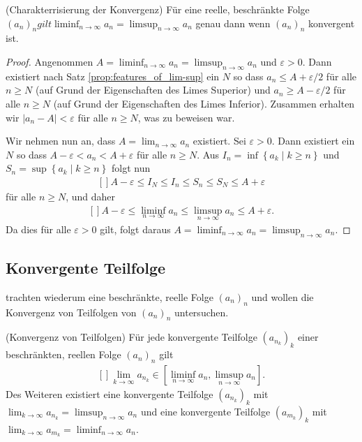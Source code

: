 \documentclass[../Analysis1_script.tex]{subfiles}
\begin{document}
\begin{corollary}{(Charakterrisierung der Konvergenz)}
	Für eine reelle, beschränkte Folge $(a_n)_n gilt \liminf _{n\to \infty }a_n=\limsup _{n\to \infty }a_n$ genau dann wenn $(a_n)_n$ konvergent ist. 
\end{corollary}

\begin{proof}
	Angenommen $A=\liminf _{n\to \infty }a_n=\limsup _{n\to \infty }a_n$ und $\varepsilon >0$. Dann existiert nach Satz \ref{prop:features_of_lim-sup} ein $N$ so dass $a_n\leq A+\varepsilon /2$ für alle $n\geq N$ (auf Grund der Eigenschaften des Limes Superior) und $a_n\geq A-\varepsilon /2$ für alle $n\geq N$ (auf Grund der Eigenschaften des Limes Inferior). Zusammen erhalten wir $|a_n-A|<\varepsilon$ für alle $n\geq N$, was zu beweisen war.
	
	Wir nehmen nun an, dass $A=\lim _{n\to \infty }a_n$ existiert. Sei $\varepsilon >0$. Dann existiert ein $N$ so dass $A-\varepsilon <a_n<A+\varepsilon$ für alle $n\geq N$. Aus $I_n=\inf \left \lbrace {a_k} \mid {k\geq n}\right \rbrace$ und $S_n=\sup \left \lbrace {a_k} \mid {k\geq n}\right \rbrace$ folgt nun
	\[\begin{aligned}[]
		A-\varepsilon \leq I_N\leq I_n\leq S_n\leq S_N\leq A+\varepsilon
	\end{aligned}\]
	für alle $n\geq N$, und daher
	\[\begin{aligned}[]
		A-\varepsilon \leq \liminf _{n\to \infty }a_n\leq \limsup _{n\to \infty }a_n \leq A+\varepsilon .
	\end{aligned}\]
	Da dies für alle $\varepsilon >0$ gilt, folgt daraus $A=\liminf _{n\to \infty }a_n=\limsup _{n\to \infty }a_n$. 
\end{proof}

\subsection{Konvergente Teilfolge}

trachten wiederum eine beschränkte, reelle Folge $(a_n)_n$ und wollen die Konvergenz von Teilfolgen von $(a_n)_n$ untersuchen.

\begin{proposition}{(Konvergenz von Teilfolgen)}
	Für jede konvergente Teilfolge $(a_{n_k})_k$ einer beschränkten, reellen Folge $(a_n)_n$ gilt
	\[\begin{aligned}[]
		\lim _{k \to \infty }a_{n_k} \in [\liminf _{n \to \infty } a_n, \limsup _{n \to \infty }a_n].
	\end{aligned}\]
	Des Weiteren existiert eine konvergente Teilfolge $(a_{n_k})_k$ mit $\lim _{k \to \infty }a_{n_k} = \limsup _{n \to \infty }a_n$ und eine konvergente Teilfolge $(a_{m_k})_k$ mit $\lim _{k \to \infty }a_{m_k} = \liminf _{n \to \infty }a_n$. 
\end{proposition}
\end{document}
